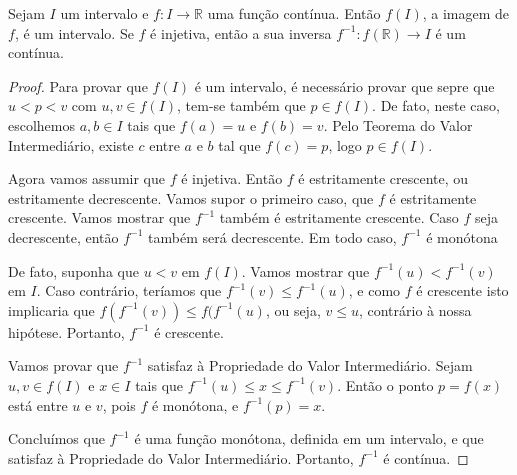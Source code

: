 \begin{theorem}
	Sejam $I$ um intervalo e $f\colon I\to\mathbb{R}$ uma função contínua. Então $f(I)$, a imagem de $f$, é um intervalo. Se $f$ é injetiva, então a sua inversa $f^{-1}\colon f(\mathbb{R})\to I$ é um contínua.
\end{theorem}

\begin{proof}
	Para provar que $f(I)$ é um intervalo, é necessário provar que sepre que $u<p<v$ com $u,v\in f(I)$, tem-se também que $p\in f(I)$. De fato, neste caso, escolhemos $a,b\in I$ tais que $f(a)=u$ e $f(b)=v$. Pelo Teorema do Valor Intermediário, existe $c$ entre $a$ e $b$ tal que $f(c)=p$, logo $p\in f(I)$.
	
	Agora vamos assumir que $f$ é injetiva. Então $f$ é estritamente crescente, ou estritamente decrescente. Vamos supor o primeiro caso, que $f$ é estritamente crescente. Vamos mostrar que $f^{-1}$ também é estritamente crescente. Caso $f$ seja decrescente, então $f^{-1}$ também será decrescente. Em todo caso, $f^{-1}$ é monótona
	
	De fato, suponha que $u<v$ em $f(I)$. Vamos mostrar que $f^{-1}(u)<f^{-1}(v)$ em $I$. Caso contrário, teríamos que $f^{-1}(v)\leq f^{-1}(u)$, e como $f$ é crescente isto implicaria que $f(f^{-1}(v))\leq f(f^{-1}(u)$, ou seja, $v\leq u$, contrário à nossa hipótese. Portanto, $f^{-1}$ é crescente.
	
	Vamos provar que $f^{-1}$ satisfaz à Propriedade do Valor Intermediário. Sejam $u,v\in f(I)$ e $x\in I$ tais que $f^{-1}(u)\leq x\leq f^{-1}(v)$. Então o ponto $p=f(x)$ está entre $u$ e $v$, pois $f$ é monótona, e $f^{-1}(p)=x$.
	
	Concluímos que $f^{-1}$ é uma função monótona, definida em um intervalo, e que satisfaz à Propriedade do Valor Intermediário. Portanto, $f^{-1}$ é contínua.
\end{proof}